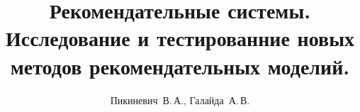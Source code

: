\documentclass[12pt,twoside]{article}
\title
    [Рекомендательные системы]
    {Рекомендательные системы. Исследование и тестированние новых методов рекомендательных моделий.}
\author
    [Галайда~А.\,В.]
    {Пикиневич~В.\,А., Галайда~А.\,В.}
\begin{document}
\maketitle
\bigskip
\bigskip
\bigskip
\bigskip
\bigskip
\maketitleSecondary
\end{document}
